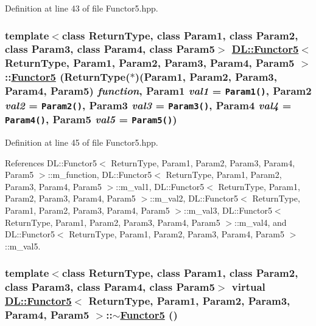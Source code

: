 Definition at line 43 of file Functor5.hpp.\hypertarget{classDL_1_1Functor5_a0}{
\subsubsection[Functor5]{\setlength{\rightskip}{0pt plus 5cm}template$<$class Return\-Type, class Param1, class Param2, class Param3, class Param4, class Param5$>$ \hyperlink{classDL_1_1Functor5}{DL::Functor5}$<$ Return\-Type, Param1, Param2, Param3, Param4, Param5 $>$::\hyperlink{classDL_1_1Functor5}{Functor5} (Return\-Type($\ast$)(Param1, Param2, Param3, Param4, Param5) {\em function}, Param1 {\em val1} = {\tt Param1()}, Param2 {\em val2} = {\tt Param2()}, Param3 {\em val3} = {\tt Param3()}, Param4 {\em val4} = {\tt Param4()}, Param5 {\em val5} = {\tt Param5()})}}
\label{classDL_1_1Functor5_a0}




Definition at line 45 of file Functor5.hpp.

References DL::Functor5$<$ Return\-Type, Param1, Param2, Param3, Param4, Param5 $>$::m\_\-function, DL::Functor5$<$ Return\-Type, Param1, Param2, Param3, Param4, Param5 $>$::m\_\-val1, DL::Functor5$<$ Return\-Type, Param1, Param2, Param3, Param4, Param5 $>$::m\_\-val2, DL::Functor5$<$ Return\-Type, Param1, Param2, Param3, Param4, Param5 $>$::m\_\-val3, DL::Functor5$<$ Return\-Type, Param1, Param2, Param3, Param4, Param5 $>$::m\_\-val4, and DL::Functor5$<$ Return\-Type, Param1, Param2, Param3, Param4, Param5 $>$::m\_\-val5.\hypertarget{classDL_1_1Functor5_a1}{
\subsubsection[$\sim$Functor5]{\setlength{\rightskip}{0pt plus 5cm}template$<$class Return\-Type, class Param1, class Param2, class Param3, class Param4, class Param5$>$ virtual \hyperlink{classDL_1_1Functor5}{DL::Functor5}$<$ Return\-Type, Param1, Param2, Param3, Param4, Param5 $>$::$\sim$\hyperlink{classDL_1_1Functor5}{Functor5} ()}}
\label{classDL_1_1Functor5_a1}




